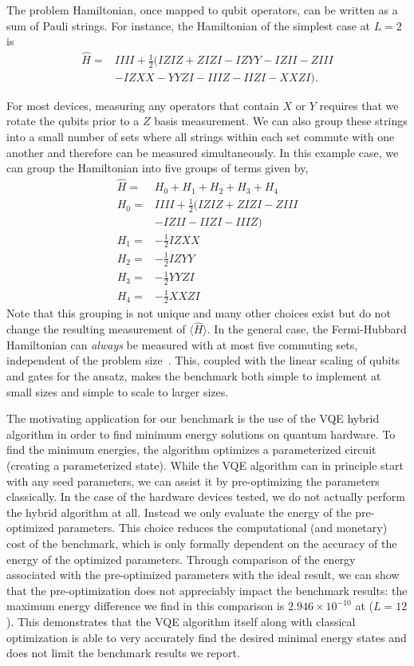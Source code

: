 \documentclass[
prx,
superscriptaddress,
twocolumn,
longbibliography
]{revtex4-1}
\begin{document}
The problem Hamiltonian, once mapped to qubit operators, can be written as a sum of Pauli strings. For instance, the Hamiltonian of the simplest case at $L=2$ is
\begin{eqnarray}
\hat{H}=&IIII+\frac{1}{2}(IZIZ+ZIZI-IZYY-IZII-ZIII \nonumber \\
&-IZXX-YYZI-IIIZ-IIZI-XXZI)\nonumber.
\end{eqnarray}

For most devices, measuring any operators that contain $X$ or $Y$ requires that we rotate the qubits prior to a $Z$ basis measurement. We can also group these strings into a small number of sets where all strings within each set commute with one another and therefore can be measured simultaneously. In this example case, we can group the Hamiltonian into five groups of terms given by,
\begin{eqnarray}
\hat{H}=&H_0+H_1+H_2+H_3+H_4\nonumber \\
H_0=& IIII+\frac{1}{2}(IZIZ+ZIZI-ZIII\nonumber \\
&-IZII-IIZI-IIIZ)\nonumber \\
H_1=&-\frac{1}{2}IZXX\nonumber\\
H_2=&-\frac{1}{2}IZYY\nonumber\\
H_3=&-\frac{1}{2}YYZI\nonumber\\
H_4=&-\frac{1}{2}XXZI\nonumber
\end{eqnarray}
Note that this grouping is not unique and many other choices exist but do not change the resulting measurement of $\langle \hat{H} \rangle$. In the general case, the Fermi-Hubbard Hamiltonian can \textit{always} be measured with at most five commuting sets, independent of the problem size~\cite{PhysRevB.102.235122}. This, coupled with the linear scaling of qubits and gates for the ansatz, makes the benchmark both simple to implement at small sizes and simple to scale to larger sizes.

The motivating application for our benchmark is the use of the VQE hybrid algorithm in order to find minimum energy solutions on quantum hardware. To find the minimum energies, the algorithm optimizes a parameterized circuit (creating a parameterized state). While the VQE algorithm can in principle start with any seed parameters, we can assist it by pre-optimizing the parameters classically.  In the case of the hardware devices tested, we do not actually perform the hybrid algorithm at all. Instead we only evaluate the energy of the pre-optimized parameters. This choice reduces the computational (and monetary) cost of the benchmark, which is only formally dependent on the accuracy of the energy of the optimized parameters. Through comparison of the energy associated with the pre-optimized parameters with the ideal result, we can show that the pre-optimization does not appreciably impact the benchmark results: the maximum energy difference we find in this comparison is $2.946 \times 10^{-10}$ at ($L=12$). This demonstrates that the VQE algorithm itself along with classical optimization is able to very accurately find the desired minimal energy states and does not limit the benchmark results we report.
\end{document}
